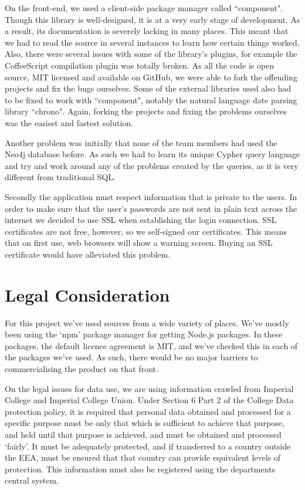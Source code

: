\documentclass[11pt]{article}
\begin{document}
On the front-end, we used a client-side package manager called ``component". Though this library is well-designed, it is at a very early stage of development. As a result, its documentation is severely lacking in many places. This meant that we had to read the source in several instances to learn how certain things worked. Also, there were several issues with some of the library's plugins, for example the CoffeeScript compilation plugin was totally broken. As all the code is open source, MIT licensed and available on GitHub, we were able to fork the offending projects and fix the bugs ourselves. Some of the external libraries used also had to be fixed to work with ``component", notably the natural language date parsing library ``chrono". Again, forking the projects and fixing the problems ourselves was the easiest and fastest solution.

Another problem was initially that none of the team members had used the Neo4j database before. As such we had to learn its unique Cypher query language and try and work around any of the problems created by the queries, as it is very different from traditional SQL.

Secondly the application must respect information that is private to the users. In order to make sure that the user's passwords are not sent in plain text across the internet we decided to use SSL when establishing the login connection. SSL certificates are not free, however, so we self-signed our certificates. This means that on first use, web browsers will show a warning screen. Buying an SSL certificate would have alleviated this problem.

\section {Legal Consideration}

For this project we've used sources from a wide variety of places. We've mostly been using the `npm' package manager for getting Node.js packages. In these packages, the default licence agreement is MIT, and we've checked this in each of the packages we've used. As such, there would be no major barriers to commercialising the product on that front.

On the legal issues for data use, we are using information crawled from Imperial College and Imperial College Union. Under Section 6 Part 2 of the College Data protection policy, it is required that personal data obtained and processed for a specific purpose must be only that which is sufficient to achieve that purpose, and held until that purpose is achieved, and must be obtained and processed `fairly'. It must be adequately protected, and if transferred to a country outside the EEA, must be ensured that that country can provide equivalent levels of protection. This information must also be registered using the departments central system.
\end{document}

